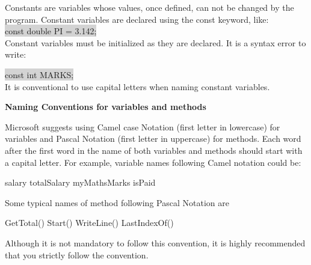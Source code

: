 Constants are variables whose values, once defined, can not be changed by the program. Constant variables are
declared using the const keyword, like:\\

\colorbox{lightgray}{const double PI = 3.142;}\\


Constant variables must be initialized as they are declared. It is a syntax error to write:

\colorbox{lightgray}{const int MARKS;}\\

It is conventional to use capital letters when naming constant variables.

\textbf{Naming Conventions for variables and methods}

Microsoft suggests using Camel case Notation (first letter in lowercase) for variables and Pascal Notation (first letter in
uppercase) for methods. Each word after the first word in the name of both variables and methods should start with
a capital letter. For example, variable names following Camel notation could be:

salary totalSalary
myMathsMarks isPaid

Some typical names of method following Pascal Notation are

GetTotal() Start()
WriteLine() LastIndexOf()

Although it is not mandatory to follow this convention, it is highly recommended that you strictly follow the
convention.